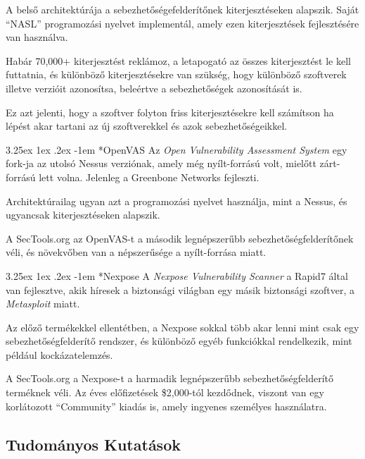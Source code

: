 \documentclass[a4paper,12pt]{article}
\makeatletter
\renewcommand\paragraph{\@startsection{paragraph}{6}{\parindent}%
  {3.25ex \@plus1ex \@minus .2ex}%
  {-1em}%
  {\normalfont\normalsize\bfseries}}
\makeatother
\begin{document}
	A belső architektúrája a sebezhetőségefelderítőnek kiterjesztéseken alapszik. Saját ``NASL'' programozási nyelvet implementál, amely ezen kiterjesztések fejlesztésére van használva.
	
	Habár 70,000+ kiterjesztést reklámoz, a letapogató az összes kiterjesztést le kell futtatnia, és különböző kiterjesztésekre van szükség, hogy különböző szoftverek illetve verzióit azonosítsa, beleértve a sebezhetőségek azonosítását is.
	
	Ez azt jelenti, hogy a szoftver folyton friss kiterjesztésekre kell számítson ha lépést akar tartani az új szoftverekkel és azok sebezhetőségeikkel.
	
	\paragraph*{OpenVAS} Az \textit{Open Vulnerability Assessment System}\cite{openvas} egy fork-ja az utolsó Nessus verziónak, amely még nyílt-forrású volt, mielőtt zárt-forrású lett volna. Jelenleg a Greenbone Networks fejleszti.
	
	Architektúrailag ugyan azt a programozási nyelvet használja, mint a Nessus, és ugyancsak kiterjesztéseken alapszik.
	
	A SecTools.org az OpenVAS-t a második legnépszerűbb sebezhetőségfelderítőnek véli, és növekvőben van a népszerűsége a nyílt-forrása miatt.
	
	\paragraph*{Nexpose} A \textit{Nexpose Vulnerability Scanner}\cite{nexpose} a Rapid7 által van fejlesztve, akik híresek a biztonsági világban egy másik biztonsági szoftver, a \textit{Metasploit} miatt.
	
	Az előző termékekkel ellentétben, a Nexpose sokkal több akar lenni mint csak egy sebezhetőségfelderítő rendszer, és különböző egyéb funkciókkal rendelkezik, mint például kockázatelemzés.
	
	A SecTools.org a Nexpose-t a harmadik legnépszerűbb sebezhetőségfelderítő terméknek véli. Az éves előfizetések \$2,000-tól kezdődnek, viszont van egy korlátozott ``Community'' kiadás is, amely ingyenes személyes használatra.
	
\subsection{Tudományos Kutatások}
	
\end{document}
